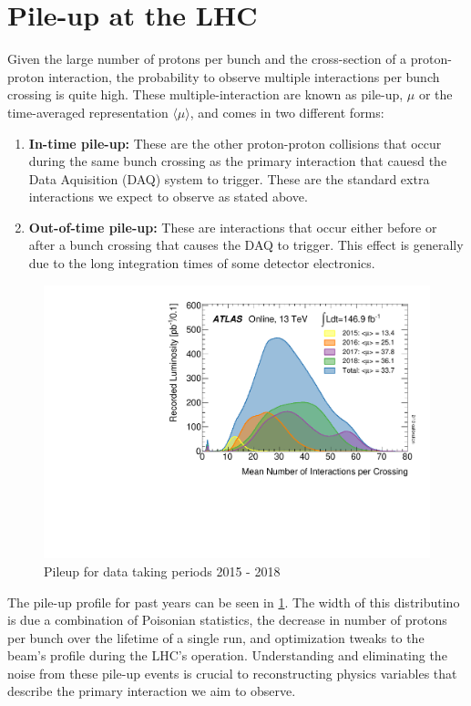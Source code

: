 \section{Pile-up at the LHC} \label{sec:lhc:pileup}

Given the large number of protons per bunch and the cross-section of a
proton-proton interaction, the probability to observe multiple interactions per
bunch crossing is quite high.  These multiple-interaction are known as pile-up,
$\mu$ or the time-averaged representation $\langle \mu \rangle$, and comes in two
different forms: 

\begin{enumerate} \item \textbf{In-time pile-up:} These are the other
proton-proton collisions that occur during the same bunch crossing as the
primary interaction that cauesd the Data Aquisition (DAQ) system to trigger.
These are the standard extra interactions we expect to observe as stated above.
\item \textbf{Out-of-time pile-up:} These are interactions that occur either
before or after a bunch crossing that causes the DAQ to trigger.  This effect is
generally due to the long integration times of some detector electronics.
\end{enumerate}

\begin{figure}[!htbp] 
  \begin{center}
    \includegraphics[width=0.9\linewidth]{figures/lhc/pileup.pdf}
    \caption{ Pileup for data taking periods 2015 - 2018} 
    \label{fig:pileup} 
  \end{center} 
\end{figure}

The pile-up profile for past years can be seen in \cref{fig:pileup}.  The width
of this distributino is due a combination of Poisonian statistics, the decrease
in number of protons per bunch over the lifetime of a single run, and
optimization tweaks to the beam's profile during the LHC's operation.
Understanding and eliminating the noise from these pile-up events is crucial to
reconstructing physics variables that describe the primary interaction we aim
to observe.

